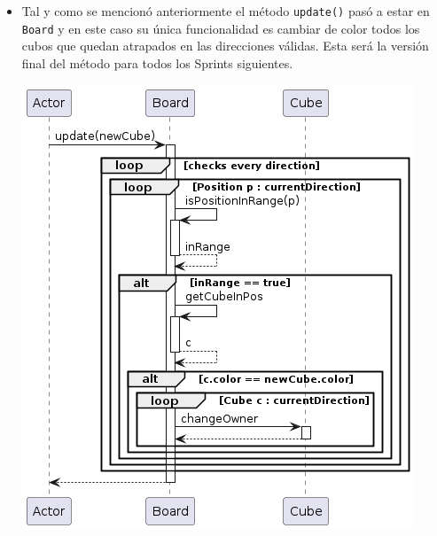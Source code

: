 \documentclass[../DocumentoOficial.tex]{subfiles}
\begin{document}
\begin{sprint}[2]
\begin{itemize}
\item Tal y como se mencionó anteriormente el método \texttt{update()} pasó a estar en \texttt{Board} y en este caso su única funcionalidad es cambiar de color todos los cubos que quedan atrapados en las direcciones válidas. Esta será la versión final del método para todos los Sprints siguientes.
\begin{center}
\includegraphics[scale=0.65]{Board.update()-sprint7.png}
\end{center}
\end{itemize} 
\end{sprint}
\newpage
\end{document}
